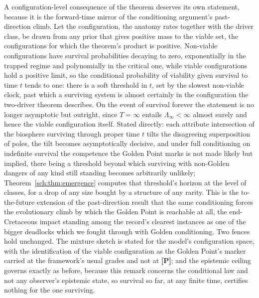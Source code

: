 \begin{remark}\label{gr1:rem:forwardforcing}
A configuration-level consequence of the theorem deserves its own
statement, because it is the forward-time mirror of the conditioning
argument's past-direction climb. Let the configuration, the anatomy
rates together with the driver class, be drawn from any prior that
gives positive mass to the viable set, the configurations for which
the theorem's product is positive. Non-viable configurations have
survival probabilities decaying to zero, exponentially in the trapped
regime and polynomially in the critical one, while viable
configurations hold a positive limit, so the conditional probability
of viability given survival to time $t$ tends to one: there is a soft
threshold in $t$, set by the slowest non-viable clock, past which a
surviving system is almost certainly in the configuration the
two-driver theorem describes. On the event of survival forever the
statement is no longer asymptotic but outright, since $T=\infty$
entails $\Lambda_\infty<\infty$ almost surely and hence the viable
configuration itself. Stated directly: each attribute
intersection of the biosphere surviving through proper time $t$ tilts
the disagreeing superposition of poles, the tilt becomes
asymptotically decisive, and under full conditioning on indefinite
survival the competence the Golden Point marks is not made likely but
implied, there being a threshold beyond which surviving with
non-Golden dangers of any kind still standing becomes arbitrarily
unlikely; Theorem~\ref{sch:thm:emergence} computes that threshold's
horizon at the level of classes, for a drop of any size bought by a
structure of any rarity. This is the to-the-future extension of the past-direction
result that the same conditioning forces the evolutionary climb by
which the Golden Point is reachable at all, the end-Cretaceous impact
standing among the record's clearest instances as one of the bigger
deadlocks which we fought through with Golden conditioning. Two fences hold
unchanged. The mixture sketch is stated for the model's configuration
space, with the identification of the viable configuration as the
Golden Point's marker carried at the framework's usual grades and not
at \textbf{[P]}; and the epistemic ceiling governs exactly as before,
because this remark concerns the conditional law and not any
observer's epistemic state, so survival so far, at any finite time,
certifies nothing for the one surviving.
\end{remark}

